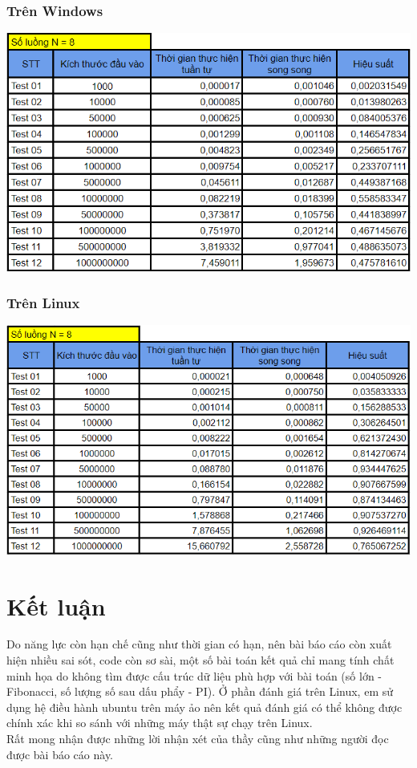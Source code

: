 \documentclass[12pt,a4paper]{report}
\begin{document}
\subsection{Trên Windows}
\begin{center}
	\includegraphics[scale=0.9]{./Photos/PI/BenchmarkOnWin.PNG}
\end{center}
\clearpage
\subsection{Trên Linux}
\begin{center}
	\includegraphics[scale=0.9]{./Photos/PI/BenchmarkOnLinux.PNG}
\end{center}


\chapter*{Kết luận}                         %
Do năng lực còn hạn chế cũng như thời gian có hạn, nên bài báo cáo còn xuất hiện nhiều sai sót, code còn sơ sài, một số bài toán kết quả chỉ mang tính chất minh họa do không tìm được cấu trúc dữ liệu phù hợp với bài toán (số lớn - Fibonacci, số lượng số sau dấu phẩy - PI). Ở phần đánh giá trên Linux, em sử dụng hệ điều hành ubuntu trên máy ảo nên kết quả đánh giá có thể không được chính xác khi so sánh với những máy thật sự chạy trên Linux. \\
Rất mong nhận được những lời nhận xét của thầy cũng như những người đọc được bài báo cáo này.
\end{document}
